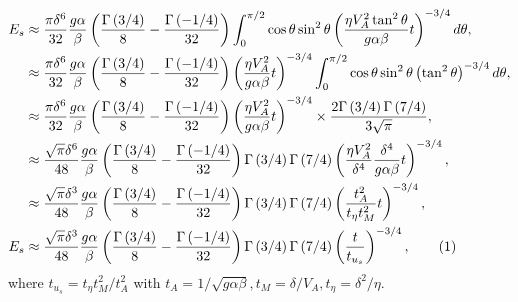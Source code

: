 \documentclass[12pt,psfig]{article}
\newcommand\numberthis{\addtocounter{equation}{1}\tag{\theequation}}
\begin{document}
\begin{align*}
E_s&\approx \dfrac{\pi\delta^6}{32}\dfrac{g\alpha}{\beta } \left(\dfrac{\Gamma \left(3/4\right)}{8}-\dfrac{\Gamma \left(-1/4\right)}{32}\right)\int_{0}^{\pi/2}\cos\theta \sin^2\theta \left(\dfrac{\eta V_A^2 \tan^2\theta}{g\alpha\beta}t\right)^{-3/4}  d\theta,\\
&\approx \dfrac{\pi\delta^6}{32}\dfrac{g\alpha}{\beta } \left(\dfrac{\Gamma \left(3/4\right)}{8}-\dfrac{\Gamma \left(-1/4\right)}{32}\right)\left(\dfrac{\eta V_A^2}{g\alpha\beta}t\right)^{-3/4}\int_{0}^{\pi/2}\cos\theta \sin^2\theta \left(\tan^2\theta\right)^{-3/4}  d\theta,\\
&\approx \dfrac{\pi\delta^6}{32}\dfrac{g\alpha}{\beta } \left(\dfrac{\Gamma \left(3/4\right)}{8}-\dfrac{\Gamma \left(-1/4\right)}{32}\right)\left(\dfrac{\eta V_A^2}{g\alpha\beta}t\right)^{-3/4}\times\dfrac{2 \Gamma \left(3/4\right) \Gamma \left(7/4\right)}{3 \sqrt{\pi }},\\
&\approx \dfrac{\sqrt{\pi}\delta^6}{48}\dfrac{g\alpha}{\beta} \left(\dfrac{\Gamma \left(3/4\right)}{8}-\dfrac{\Gamma \left(-1/4\right)}{32}\right)\Gamma \left(3/4\right)\Gamma \left(7/4\right)\left(\dfrac{\eta V_A^2}{\delta^4}\dfrac{\delta^4}{g\alpha\beta}t\right)^{-3/4},\\
&\approx \dfrac{\sqrt{\pi}\delta^3}{48}\dfrac{g\alpha}{\beta} \left(\dfrac{\Gamma \left(3/4\right)}{8}-\dfrac{\Gamma \left(-1/4\right)}{32}\right)\Gamma \left(3/4\right)\Gamma \left(7/4\right)\left(\dfrac{ t_A^2}{t_\eta t_M^2}t\right)^{-3/4},\\
E_s&\approx \dfrac{\sqrt{\pi}\delta^3}{48}\dfrac{g\alpha}{\beta} \left(\dfrac{\Gamma \left(3/4\right)}{8}-\dfrac{\Gamma \left(-1/4\right)}{32}\right)\Gamma \left(3/4\right)\Gamma \left(7/4\right)\left(\dfrac{t}{t_{u_s}}\right)^{-3/4}, \numberthis \label{Eus34}
\end{align*}
where $t_{u_s}=t_\eta t_M^2/t_A^2$ with $t_A=1/\sqrt{g\alpha\beta}, t_M=\delta/V_A, t_\eta=\delta^2/\eta$.
\end{document}
